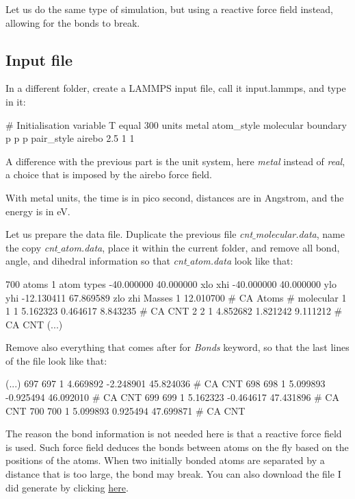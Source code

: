 Let us do the same type of simulation, but using a reactive force field 
instead, allowing for the bonds to break.

\subsection{Input file}

\noindent In a different folder, create a LAMMPS input file, call it
input.lammps, and type in it:

\begin{lcverbatim}
# Initialisation
variable T equal 300
units metal
atom_style molecular
boundary p p p
pair_style airebo 2.5 1 1
\end{lcverbatim}

\noindent A difference with the previous part
is the unit system, here \textit{metal} instead of \textit{real}, a choice
that is imposed by the airebo force field.

\begin{tcolorbox}[colback=mylightblue!5!white,colframe=mylightblue!75!black,title=About metal units]
With metal units, the time is in pico second, 
distances are in Angstrom, and the energy is in eV.
\end{tcolorbox}

\noindent Let us prepare the data file. Duplicate the 
previous file \textit{cnt$\_$molecular.data}, name the copy \textit{cnt$\_$atom.data},
place it within the 
current folder, and remove all bond, angle, and dihedral 
information so that \textit{cnt$\_$atom.data} look like that: 

\begin{lcverbatim}
700 atoms
1 atom types
-40.000000 40.000000  xlo xhi
-40.000000 40.000000  ylo yhi
-12.130411 67.869589  zlo zhi
Masses
1 12.010700 # CA
Atoms # molecular
1 1 1 5.162323 0.464617 8.843235 # CA CNT
2 2 1 4.852682 1.821242 9.111212 # CA CNT
(...)
\end{lcverbatim}

\noindent Remove also everything that comes after for \textit{Bonds}
keyword, so that the last lines of the file look like that:

\begin{lcverbatim}
(...)
697 697 1 4.669892 -2.248901 45.824036 # CA CNT
698 698 1 5.099893 -0.925494 46.092010 # CA CNT
699 699 1 5.162323 -0.464617 47.431896 # CA CNT
700 700 1 5.099893 0.925494 47.699871 # CA CNT
\end{lcverbatim}

\noindent The reason the bond information is not needed here is that 
a reactive force field is used. Such force field 
deduces the bonds between atoms on the fly based on the positions of the atoms.
When two initially bonded atoms are separated by a 
distance that is too large, the bond may break. 
You can also download the file I did generate 
by clicking \href{../../../../../inputs/level1/breaking-a-carbon-nanotube/breakable-bonds/cnt_atom.data}{here}.

